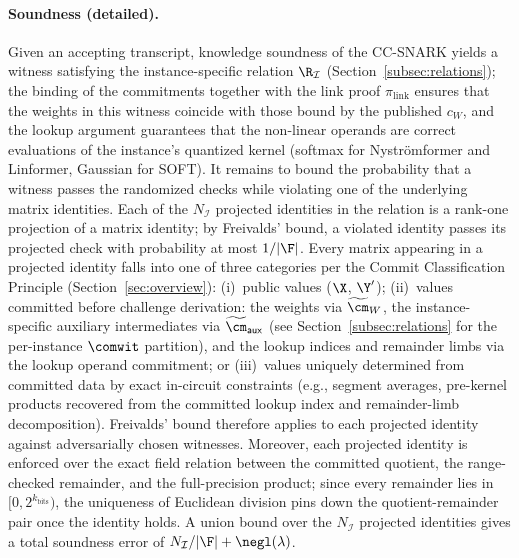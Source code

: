 \paragraph{Soundness (detailed).}
Given an accepting transcript, knowledge soundness of the CC-SNARK yields a witness satisfying the instance-specific relation $\R_\mathcal{I}$ (Section~\ref{subsec:relations}); the binding of the commitments together with the link proof $\pi_{\mathrm{link}}$ ensures that the weights in this witness coincide with those bound by the published $c_W$, and the lookup argument guarantees that the non-linear operands are correct evaluations of the instance's quantized kernel (softmax for Nystr\"{o}mformer and Linformer, Gaussian for SOFT). It remains to bound the probability that a witness passes the randomized checks while violating one of the underlying matrix identities. Each of the $N_\mathcal{I}$ projected identities in the relation is a rank-one projection of a matrix identity; by Freivalds' bound, a violated identity passes its projected check with probability at most $1/|\F|$. Every matrix appearing in a projected identity falls into one of three categories per the Commit Classification Principle (Section~\ref{sec:overview}): (i)~public values ($\X$, $\Y'$); (ii)~values committed before challenge derivation: the weights via $\widetilde{\cm}_{W}$, the instance-specific auxiliary intermediates via $\widetilde{\cm}_{\mathsf{aux}}$ (see Section~\ref{subsec:relations} for the per-instance $\comwit$ partition), and the lookup indices and remainder limbs via the lookup operand commitment; or (iii)~values uniquely determined from committed data by exact in-circuit constraints (e.g., segment averages, pre-kernel products recovered from the committed lookup index and remainder-limb decomposition). Freivalds' bound therefore applies to each projected identity against adversarially chosen witnesses. Moreover, each projected identity is enforced over the exact field relation between the committed quotient, the range-checked remainder, and the full-precision product; since every remainder lies in $[0, 2^{k_{\text{bits}}})$, the uniqueness of Euclidean division pins down the quotient-remainder pair once the identity holds. A union bound over the $N_\mathcal{I}$ projected identities gives a total soundness error of $N_\mathcal{I}/|\F| + \negl(\lambda)$.

